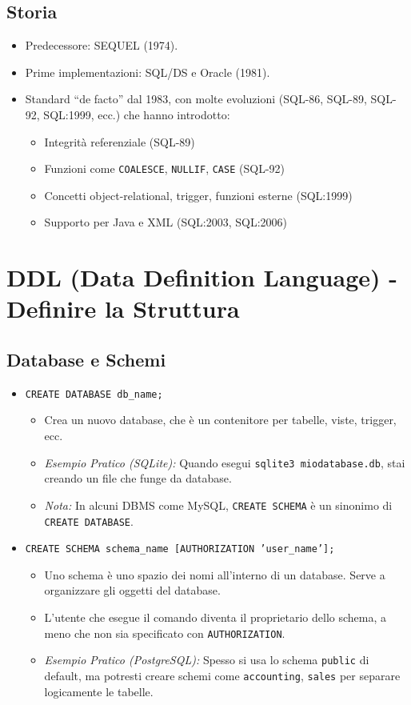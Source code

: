 	\subsection{Storia}
	\begin{itemize}
		\item Predecessore: SEQUEL (1974).
		\item Prime implementazioni: SQL/DS e Oracle (1981).
		\item Standard ``de facto'' dal 1983, con molte evoluzioni (SQL-86, SQL-89, SQL-92, SQL:1999, ecc.) che hanno introdotto:
		\begin{itemize}
			\item Integrità referenziale (SQL-89)
			\item Funzioni come \texttt{COALESCE}, \texttt{NULLIF}, \texttt{CASE} (SQL-92)
			\item Concetti object-relational, trigger, funzioni esterne (SQL:1999)
			\item Supporto per Java e XML (SQL:2003, SQL:2006)
		\end{itemize}
	\end{itemize}
	
	\section{DDL (Data Definition Language) - Definire la Struttura}
	
	\subsection{Database e Schemi}
	\begin{itemize}
		\item \texttt{CREATE DATABASE db\_name;}
		\begin{itemize}
			\item Crea un nuovo database, che è un contenitore per tabelle, viste, trigger, ecc.
			\item \textit{Esempio Pratico (SQLite):} Quando esegui \texttt{sqlite3 miodatabase.db}, stai creando un file che funge da database.
			\item \textit{Nota:} In alcuni DBMS come MySQL, \texttt{CREATE SCHEMA} è un sinonimo di \texttt{CREATE DATABASE}.
		\end{itemize}
		\item \texttt{CREATE SCHEMA schema\_name [AUTHORIZATION 'user\_name'];}
		\begin{itemize}
			\item Uno schema è uno spazio dei nomi all'interno di un database. Serve a organizzare gli oggetti del database.
			\item L'utente che esegue il comando diventa il proprietario dello schema, a meno che non sia specificato con \texttt{AUTHORIZATION}.
			\item \textit{Esempio Pratico (PostgreSQL):} Spesso si usa lo schema \texttt{public} di default, ma potresti creare schemi come \texttt{accounting}, \texttt{sales} per separare logicamente le tabelle.
		\end{itemize}
	\end{itemize}
	
